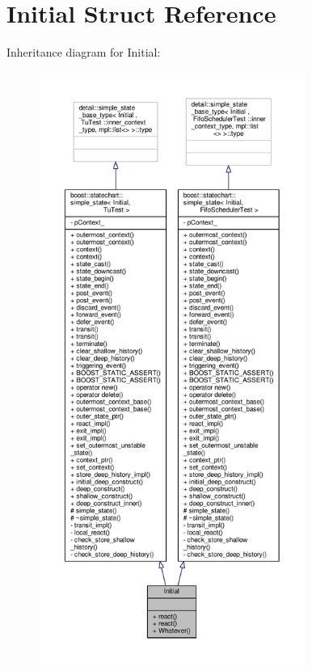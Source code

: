 \hypertarget{struct_initial}{}\section{Initial Struct Reference}
\label{struct_initial}


Inheritance diagram for Initial\+:
\nopagebreak
\begin{figure}[H]
\begin{center}
\leavevmode
\includegraphics[height=550pt]{struct_initial__inherit__graph}
\end{center}
\end{figure}


